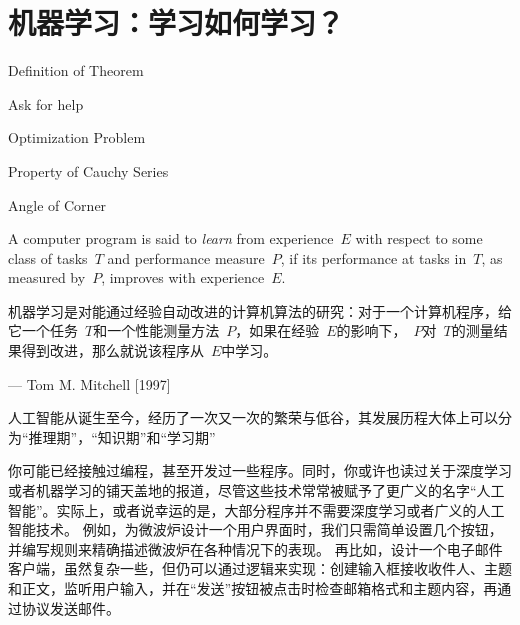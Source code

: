 
\chapter{机器学习：学习如何学习？}\label{ch:机器学习}

 \begin{introduction}
  \item Definition of Theorem
  \item Ask for help
  \item Optimization Problem
  \item Property of Cauchy Series
  \item Angle of Corner
\end{introduction}

A computer program is said to {\em learn} from experience~$ E$ with respect to some class of tasks~$T$ and performance measure~$P$, if its performance at tasks in~$T$, as measured by~$P$, improves with experience~$E$.

机器学习是对能通过经验自动改进的计算机算法的研究：对于一个计算机程序，给它一个任务~$T$和一个性能测量方法~$P$，如果在经验~$E$的影响下，~$P$对~$T$的测量结果得到改进，那么就说该程序从~$E$中学习。
\begin{flushright}
— Tom M. Mitchell  [1997]
\end{flushright}

人工智能从诞生至今，经历了一次又一次的繁荣与低谷，其发展历程大体上可以分为“推理期”，“知识期”和“学习期”%

%
%
%

你可能已经接触过编程，甚至开发过一些程序。同时，你或许也读过关于深度学习或者机器学习的铺天盖地的报道，尽管这些技术常常被赋予了更广义的名字“人工智能”。实际上，或者说幸运的是，大部分程序并不需要深度学习或者广义的人工智能技术。
例如，为微波炉设计一个用户界面时，我们只需简单设置几个按钮，并编写规则来精确描述微波炉在各种情况下的表现。
再比如，设计一个电子邮件客户端，虽然复杂一些，但仍可以通过逻辑来实现：创建输入框接收收件人、主题和正文，监听用户输入，并在“发送”按钮被点击时检查邮箱格式和主题内容，再通过协议发送邮件。

